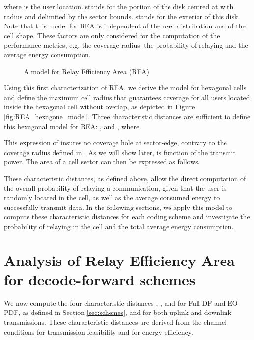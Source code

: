 \documentclass[journal]{IEEEtran}
\theoremstyle{definition}
\begin{document}
where  is the user location.  stands for the portion of the disk centred at  with radius  and delimited by the sector bounds.
 stands for the exterior of this disk. Note that this model for REA is independent of the user distribution and of the cell shape. These factors are only considered for the computation of the performance metrics, e.g. the coverage radius, the probability of relaying and the average energy consumption.


\begin{figure}
	{\centering
	 \caption{A model for Relay Efficiency Area (REA)}  
	\label{fig:REA_model}
	}
\end{figure}

Using this first characterization of REA, we derive the model for hexagonal cells and define the maximum cell radius  that guarantees coverage for all users located inside the hexagonal cell without overlap, as depicted in Figure \ref{fig:REA_hexagone_model}. Three characteristic distances are sufficient to define this hexagonal model for REA: ,  and , where

This expression of  insures no coverage hole at sector-edge, contrary to the coverage radius defined in \cite{joshi2011,khakurel2012} . 
As we will show later,  is function of the transmit power.
The area of a cell sector can then be expressed as follows.


These characteristic distances, as defined above, allow the direct computation of the overall probability of relaying a communication, given that the user is randomly located in the cell, as well as the average consumed energy to successfully transmit data.
In the following sections, we apply this model to compute these characteristic distances for each coding scheme and investigate the probability of relaying in the cell and the total average energy consumption.




\section{Analysis of Relay Efficiency Area for decode-forward schemes}
\label{sec:analysis_model}

We now compute the four characteristic distances , ,  and  for Full-DF and EO-PDF, as defined in Section \ref{sec:schemes}, and for both uplink and downlink transmissions.
These characteristic distances are derived from the channel conditions for transmission feasibility and for energy efficiency.
\end{document}
